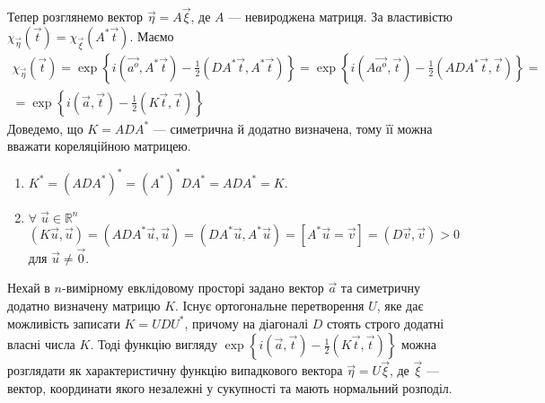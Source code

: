 Тепер розглянемо вектор $\vec{\eta} = A\vec{\xi}$, де $A$ --- невироджена матриця. За властивістю 
$\chi_{\vec{\eta}}(\vec{t}) = \chi_{\vec{\xi}}(A^{*}\vec{t})$. Маємо
\begin{equation}
    \begin{gathered}
        \chi_{\vec{\eta}}(\vec{t}) = \exp\left\{i(\vec{a^o}, A^{*}\vec{t}) - \frac{1}{2}(DA^{*}\vec{t}, A^{*}\vec{t})\right\} =
    \exp\left\{i(A\vec{a^o}, \vec{t}) - \frac{1}{2}(ADA^{*}\vec{t}, \vec{t})\right\} = \\
    = \exp\left\{i(\vec{a}, \vec{t}) - \frac{1}{2}(K\vec{t}, \vec{t})\right\}
    \end{gathered}
\end{equation}
Доведемо, що $K = ADA^{*}$ --- симетрична й додатно визначена, тому її можна вважати кореляційною матрицею.
\begin{enumerate}
    \item $K^{*} = \left( ADA^{*}\right)^{*} = \left( A^{*}\right)^{*}DA^{*} = ADA^{*} = K$.
    \item $\forall \;\vec{u} \in \mathbb{R}^n$ $\left( K \vec{u}, \vec{u}\right) = \left( ADA^{*} \vec{u}, \vec{u}\right) =
    \left( DA^{*} \vec{u}, A^{*}\vec{u}\right) = \left[ A^{*}\vec{u} = \vec{v}\right] = \left( D\vec{v}, \vec{v}\right) > 0$ для $\vec{u}\neq \vec{0}$.
\end{enumerate}

Нехай в $n$-вимірному евклідовому просторі задано вектор $\vec{a}$ та симетричну додатно визначену матрицю $K$.
Існує ортогональне перетворення $U$, яке дає можливість записати $K=UDU^{*}$, причому на діагоналі $D$ стоять строго додатні
власні числа $K$. Тоді функцію вигляду $\exp\left\{i(\vec{a}, \vec{t}) - \frac{1}{2}(K\vec{t}, \vec{t})\right\}$ 
можна розглядати як характеристичну функцію випадкового вектора $\vec{\eta} = U \vec{\xi}$, де $\vec{\xi}$ ---
вектор, координати якого незалежні у сукупності та мають нормальний розподіл.

